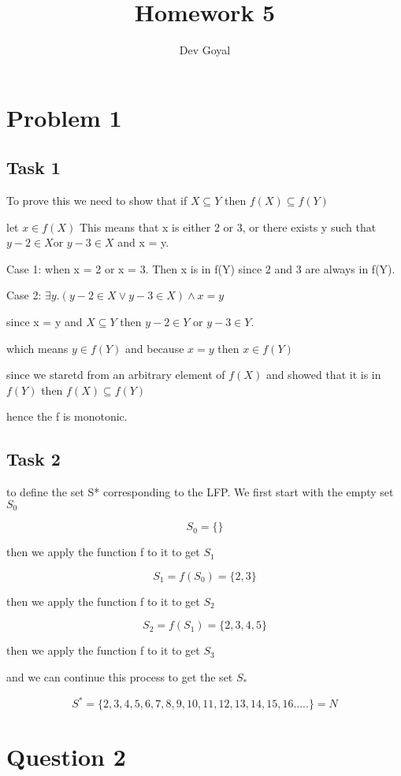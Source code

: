 \documentclass{article}
\title{Homework 5}
\author{Dev Goyal}
\begin{document}
\maketitle
\section{Problem 1}

\subsection{Task 1}

To prove this we need to show that if $X \subseteq Y$ then $f(X) \subseteq f(Y)$ 

let $x \in f(X)$ This means that x is either 2 or 3, or there exists y such that $y - 2 \in X $or $y - 3 \in X$ and x = y.

Case 1:  when x = 2 or x = 3. Then x is in f(Y) since 2 and 3 are always in f(Y).

Case 2: $\exists y. (y - 2 \in X \lor y-3 \in X )\land x = y$

since x = y  and $X \subseteq Y$ then $y - 2 \in Y$ or $y - 3 \in Y$.

which means $y \in f(Y)$ and because $x = y$ then $x \in f(Y)$

since we staretd from an arbitrary element of $f(X)$ and showed that it is in $f(Y)$ then $f(X) \subseteq f(Y)$

hence the f is monotonic.

\subsection{Task 2}

to define the set S* corresponding to the LFP. We first start with the empty set $S_0$

$$S_0 = \{ \}$$
    
    then we apply the function f to it to get $S_1$

$$S_1 = f(S_0) = \{2,3\}$$

    then we apply the function f to it to get $S_2$

    $$ S_2 = f(S_1) = \{2,3,4,5\}$$

    then we apply the function f to it to get $S_3$

and we can continue this process to get the set $S_*$

$$S^* = \{2,3,4,5,6,7,8,9,10,11,12,13,14,15,16.....\} = N $$


\section{Question 2}
\end{document}
